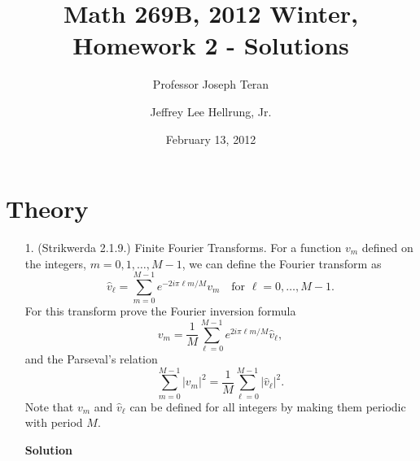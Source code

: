 \documentclass{article}
\providecommand{\abs}[1]{\left\lvert#1\right\rvert}
\begin{document}
\title{Math 269B, 2012 Winter, Homework 2 - Solutions}
\date{February 13, 2012}
\author{Professor Joseph Teran \and Jeffrey Lee Hellrung, Jr.}
\maketitle

\section{Theory}

\begin{itemize}

\item[1.] (Strikwerda 2.1.9.) Finite Fourier Transforms. For a function $v_m$ defined on the integers, $m = 0, 1, \dotsc, M-1$, we can define the Fourier transform as
\begin{equation*}
\hat{v}_{\ell} = \sum_{m=0}^{M-1} e^{-2 i \pi \ell m / M} v_m \quad \text{for } \ell = 0, \dotsc, M-1.
\end{equation*}
For this transform prove the Fourier inversion formula
\begin{equation*}
v_m = \frac{1}{M} \sum_{\ell=0}^{M-1} e^{2 i \pi \ell m / M} \hat{v}_{\ell},
\end{equation*}
and the Parseval's relation
\begin{equation*}
\sum_{m=0}^{M-1} \abs{v_m}^2 = \frac{1}{M} \sum_{\ell=0}^{M-1} \abs{\hat{v}_{\ell}}^2.
\end{equation*}
Note that $v_m$ and $\hat{v}_{\ell}$ can be defined for all integers by making them periodic with period $M$.

\textbf{Solution}


\end{itemize}
\end{document}

